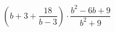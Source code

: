 \begin{ex}[type=expression]
	\begin{condition}
		\( \left( b+3+\dfrac{18}{b-3} \right)\cdot\dfrac{b^2-6b+9}{b^2+9} \)
	\end{condition}
\end{ex}